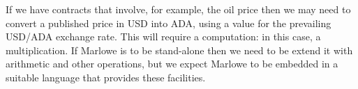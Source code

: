 \documentclass[runningheads]{llncs}
\begin{document}
If we have contracts that involve, for example, the oil price then we may need to convert a published price in USD into 
ADA, using a value for the prevailing USD/ADA exchange rate. This will require a computation: in this case, a 
multiplication. If Marlowe is to be stand-alone then we need to be extend it with arithmetic and other operations, but 
we expect Marlowe to be embedded in a suitable language that provides these facilities.

%
\end{document}
